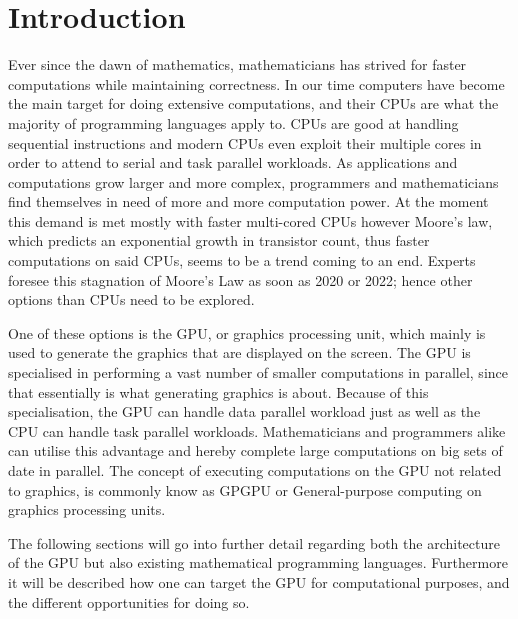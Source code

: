 \chapter{Introduction} %
\label{cha:introduction}
Ever since the dawn of mathematics, mathematicians has strived for faster computations while maintaining correctness.
In our time computers have become the main target for doing extensive computations, and their CPUs are what the majority of programming languages apply to.
CPUs are good at handling sequential instructions and modern CPUs even exploit their multiple cores in order to attend to serial and task parallel workloads.
As applications and computations grow larger and more complex, programmers and mathematicians find themselves in need of more and more computation power.
At the moment this demand is met mostly with faster multi-cored CPUs however Moore's law, which predicts an exponential growth in transistor count, thus faster computations on said CPUs, seems to be a trend coming to an end.
Experts foresee this stagnation of Moore's Law as soon as 2020 or 2022; hence other options than CPUs need to be explored. \citep{Moore2013}

One of these options is the GPU, or graphics processing unit, which mainly is used to generate the graphics that are displayed on the screen.
The GPU is specialised in performing a vast number of smaller computations in parallel, since that essentially is what generating graphics is about.
Because of this specialisation, the GPU can handle data parallel workload just as well as the CPU can handle task parallel workloads.
Mathematicians and programmers alike can utilise this advantage and hereby complete large computations on big sets of date in parallel.
The concept of executing computations on the GPU not related to graphics, is commonly know as GPGPU or General-purpose computing on graphics processing units. 

The following sections will go into further detail regarding both the architecture of the GPU but also existing mathematical programming languages.
Furthermore it will be described how one can target the GPU for computational purposes, and the different opportunities for doing so. 



